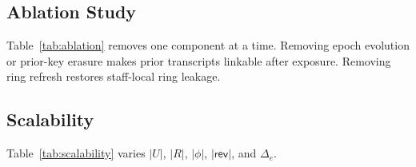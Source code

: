 \subsection{Ablation Study}
Table~\ref{tab:ablation} removes one component at a time. Removing epoch evolution or prior-key erasure makes prior transcripts linkable after exposure. Removing ring refresh restores staff-local ring leakage.

\subsection{Scalability}
Table~\ref{tab:scalability} varies $|U|$, $|R|$, $|\phi|$, $|\mathsf{rev}|$, and $\Delta_e$.
